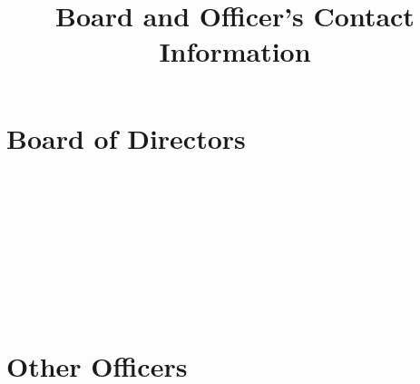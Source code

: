 


\title{Board and Officer's Contact Information}

\maketitle

\section{Board of Directors}


\address{Richard Lodge\\
Director, President\\
}

\address{Roger Button\\
Director, Corporate Secretary, NStar Chronicle Editor}\\

\address{Bill Tate\\
Director, Special Events}\\

\address{Phil Chrysler\\
Director, Merchandise}\\

\address{Garry Dupont\\
Director}\\

\address{Neil Raynor\\
Director}\\





\columnbreak  

\vspace{12pt}

\section{Other Officers}

\address{Bruce Gemmill\\
Membership Secretary\\
}

